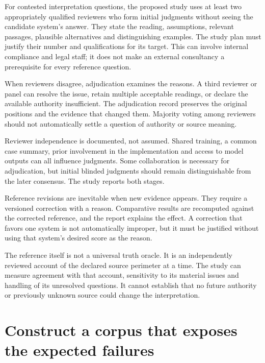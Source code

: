 For contested interpretation questions, the proposed study uses at least two
appropriately qualified reviewers who form initial judgments without seeing
the candidate system's answer. They state the reading, assumptions, relevant
passages, plausible alternatives and distinguishing examples. The study plan
must justify their number and qualifications for its target. This can involve
internal compliance and legal staff; it does not make an external consultancy
a prerequisite for every reference question.


When reviewers disagree, adjudication examines the reasons. A third reviewer or
panel can resolve the issue, retain multiple acceptable readings, or declare the
available authority insufficient. The adjudication record preserves the original
positions and the evidence that changed them. Majority voting among reviewers
should not automatically settle a question of authority or source meaning.

Reviewer independence is documented, not assumed. Shared training, a common case
summary, prior involvement in the implementation and access to model outputs can
all influence judgments. Some collaboration is necessary for adjudication, but
initial blinded judgments should remain distinguishable from the later consensus.
The study reports both stages.

Reference revisions are inevitable when new evidence appears. They require a
versioned correction with a reason. Comparative results are recomputed against
the corrected reference, and the report explains the effect. A correction that
favors one system is not automatically improper, but it must be justified without
using that system's desired score as the reason.

The reference itself is not a universal truth oracle. It is an independently
reviewed account of the declared source perimeter at a time. The study can measure
agreement with that account, sensitivity to its material issues and handling of
its unresolved questions. It cannot establish that no future authority or
previously unknown source could change the interpretation.

\section{Construct a corpus that exposes the expected failures}
\label{merge:M09:03}


